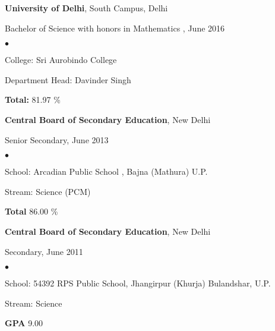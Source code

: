 \documentclass[margin,line]{res}
\newenvironment{list1}{
  \begin{list}{\ding{113}}{%
      \setlength{\itemsep}{0in}
      \setlength{\parsep}{0in} \setlength{\parskip}{0in}
      \setlength{\topsep}{0in} \setlength{\partopsep}{0in}
      \setlength{\leftmargin}{0.17in}}}{\end{list}}
\newenvironment{list2}{
  \begin{list}{$\bullet$}{%
      \setlength{\itemsep}{0in}
      \setlength{\parsep}{0in} \setlength{\parskip}{0in}
      \setlength{\topsep}{0in} \setlength{\partopsep}{0in}
      \setlength{\leftmargin}{0.2in}}}{\end{list}}
\begin{document}
\begin{resume}
{\bf University of Delhi}, South Campus, Delhi\\
\vspace*{-.1in}
\begin{list1}
\item[] Bachelor of Science with honors in Mathematics , June 2016
\vspace*{.05in}
\begin{list2}
\item College:  Sri Aurobindo College
\item Department Head:  Davinder Singh
\item[] {\bf \footnotesize Total:} 81.97 \%
\end{list2}
\end{list1}

{\bf Central Board of Secondary Education}, New Delhi\\
\vspace*{-.1in}
\begin{list1}
\item[] Senior Secondary, June 2013
\vspace*{.05in}
\begin{list2}
\item School: Arcadian Public School , Bajna (Mathura) U.P.
\item Stream: Science (PCM)	
\item[] {\bf \footnotesize Total} 86.00 \%
\end{list2}
\end{list1}


{\bf Central Board of Secondary Education}, New Delhi\\
\vspace*{-.1in}
\begin{list1}
	\item[] Secondary, June 2011
	\vspace*{.05in}
	\begin{list2}
		\item School: 54392 RPS Public School, Jhangirpur  (Khurja) Bulandshar, U.P.
		\item Stream: Science 	
		\item[] {\bf \footnotesize GPA} 9.00
	\end{list2}
\end{list1}


\end{resume}
\end{document}
